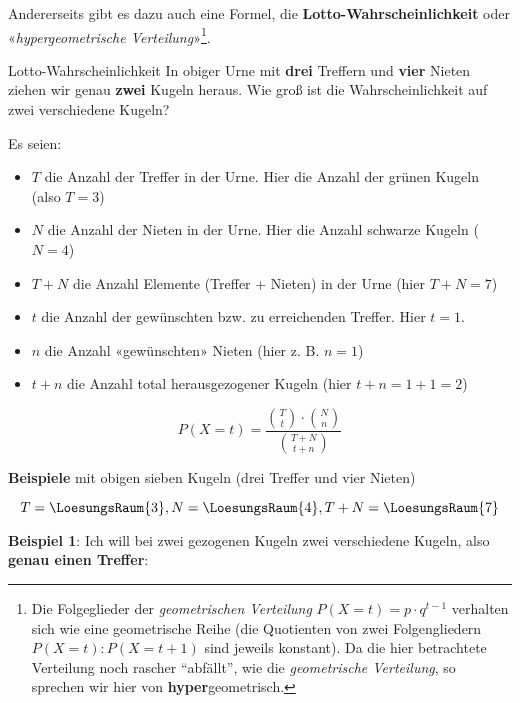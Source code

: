 Andererseits gibt es dazu auch eine Formel, die
\textbf{Lotto-Wahrscheinlichkeit} oder «\textit{hypergeometrische
  Verteilung}»\footnote{Die Folgeglieder der \textit{geometrischen
    Verteilung} $P(X=t) = p\cdot{}q^{t-1}$ verhalten sich wie eine
  geometrische Reihe (die Quotienten von zwei Folgengliedern $P(X=t) :
  P(X=t+1)$ sind jeweils konstant). Da die hier betrachtete Verteilung
  noch rascher ``abfällt'', wie die \textit{geometrische Verteilung},
  so sprechen wir hier von \textbf{hyper}geometrisch.}.

\begin{beispiel}{Lotto-Wahrscheinlichkeit}{}
  In obiger Urne mit \textbf{drei} Treffern und \textbf{vier} Nieten
  ziehen wir genau \textbf{zwei} Kugeln heraus. Wie groß ist die
  Wahrscheinlichkeit auf zwei verschiedene Kugeln?
\end{beispiel}



Es seien:
\begin{itemize}
\item $T$ die Anzahl der Treffer in der Urne. Hier die Anzahl der grünen Kugeln (also $T = 3$)
\item $N$ die Anzahl der Nieten in der Urne. Hier die Anzahl schwarze Kugeln ($N=4$)
\item $T+N$ die Anzahl Elemente (Treffer + Nieten) in der Urne (hier $T+N = 7$)

\item $t$ die Anzahl der gewünschten bzw. zu erreichenden Treffer. Hier \zB $t=1$.
  
\item $n$ die Anzahl «gewünschten» Nieten (hier z. B. $n = 1$)
\item $t+n$ die Anzahl total herausgezogener Kugeln (hier $t+n=1+1=2$)
\end{itemize}

\newpage


\begin{gesetz}{}{}
$$P(X=t) = \frac{ {T\choose t} \cdot{} {{N}\choose {n}}}{{{T+N} \choose {t+n}}}$$
\end{gesetz}

\textbf{Beispiele} mit obigen sieben Kugeln (drei Treffer und vier
Nieten)
\leserluft

$$T=\LoesungsRaum{3}, N=\LoesungsRaum{4}, T+N=\LoesungsRaum{7}$$


\textbf{Beispiel 1}: Ich will bei zwei gezogenen Kugeln zwei
verschiedene Kugeln, also \textbf{genau einen Treffer}:

